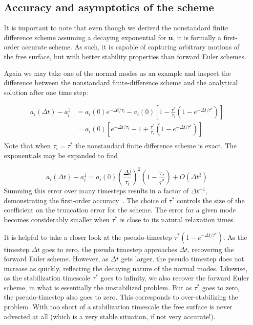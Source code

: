 \documentclass[preprint,12pt,authoryear]{elsarticle}
\newif\ifdetail
\begin{document}
\subsection{Accuracy and asymptotics of the scheme}
It is important to note that even though we derived the nonstandard finite difference scheme assuming a decaying exponential
for $\mathbf{u}$, it is formally a first-order accurate scheme. As such, it is capable of capturing arbitrary motions 
of the free surface, but with better stability properties than forward Euler schemes.

Again we may take one of the normal modes as an example and inspect the difference between the nonstandard finite-difference
scheme and the analytical solution after one time step:

\begin{equation}
\begin{aligned}
a_i(\Delta t) - a_i^{1} &= a_i(0) e^{-\Delta t/\tau_i} - a_i{(0)} \left[ 1 - \frac{\tau^*}{\tau_i} \left(1-e^{-\Delta t/\tau^*} \right) \right] \\
                        &= a_i{(0)} \left[ e^{-\Delta t/\tau_i} - 1 + \frac{\tau^*}{\tau_i} \left(1-e^{-\Delta t/\tau^*} \right) \right] \\
\end{aligned}
\end{equation}
Note that when $\tau_i = \tau^*$ the nonstandard finite difference scheme is exact.
The exponentials may be expanded to find
\ifdetail
\begin{equation}
a_i(\Delta t) - a_i^{1} = - a_i{(0)} \left[ \left(\frac{\Delta t}{\tau_i}\right)^2 - \frac{\tau^*}{\tau_i} \left(\frac{\Delta t }{\tau^* }\right)^2 \right] 
\end{equation}
\fi
\begin{equation}
a_i(\Delta t) - a_i^{1} = {a_i{(0)} } \left( \frac{\Delta t}{\tau_i} \right)^2 \left( 1 - \frac{\tau_i}{\tau^*} \right) + O(\Delta t^3)
\end{equation}
Summing this error over many timesteps results in a factor of $\Delta t^{-1}$, demonstrating the first-order accuracy~\citep[e.g.]{leveque2007finite}.
The choice of $\tau^*$ controls the size of the coefficient on the truncation error for the scheme.
The error for a given mode becomes considerably smaller when $\tau^*$ is close to its natural relaxation times.

It is helpful to take a closer look at the pseudo-timestep $\tau^*(1-e^{-\Delta t/\tau^*})$.
As the timestep $\Delta t$ goes to zero, the pseudo timestep approaches $\Delta t$, recovering 
the forward Euler scheme. However, as $\Delta t$ gets larger, the pseudo timestep does not 
increase as quickly, reflecting the decaying nature of the normal modes.
Likewise, as the stabilization timescale $\tau^*$ goes to infinity, we also recover the 
forward Euler scheme, in what is essentially the unstabilized problem. But as $\tau^*$
goes to zero, the pseudo-timestep also goes to zero. This corresponds to over-stabilizing the
problem. With too short of a stabilization timescale the free surface is never advected 
at all (which is a very stable situation, if not very accurate!).
\end{document}

